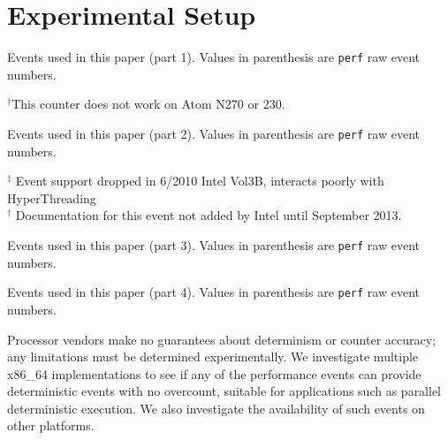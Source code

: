 \section{Experimental Setup}

\begin{tiny}
\begin{table*}[!htpb]
\caption{Events used in this paper (part 1).  
         Values in parenthesis are {\tt perf} raw event numbers.}
\label{table:events1}
\centering
\scriptsize

\hspace{0.2in}$^{\dagger}$This counter does not work on Atom N270 or 230.
\end{table*}
\end{tiny}

\begin{table*}[!htpb]
\caption{Events used in this paper (part 2).  
         Values in parenthesis are {\tt perf} raw event numbers.}
\label{table:events2}
\centering
\scriptsize

\hspace{0.2in}$^{\ddagger}$ Event support dropped in 6/2010
Intel Vol3B, interacts poorly with HyperThreading\\
\hspace{0.2in}$^{\dagger}$ Documentation for this event not added by Intel until September 2013.
\end{table*}

\begin{table*}[!htpb]
\caption{Events used in this paper (part 3).  
         Values in parenthesis are {\tt perf} raw event numbers.}
\label{table:events3}
\centering
\scriptsize

\end{table*}

\begin{table*}[!htpb]
\caption{Events used in this paper (part 4).  
         Values in parenthesis are {\tt perf} raw event numbers.}
\label{table:events4}
\centering
\scriptsize

\end{table*}


Processor vendors make no guarantees about determinism or
counter accuracy; any limitations must be determined
experimentally.  
We investigate 
multiple x86\_64 
implementations to see if any of the performance events can
provide deterministic events with no overcount, suitable for
applications such as
parallel deterministic execution.  
We also investigate the availability of such events on
other platforms.

